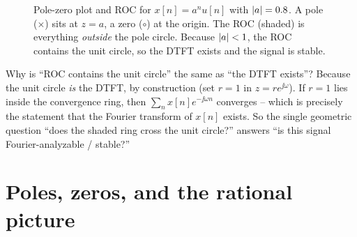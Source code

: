 \begin{figure}[H]
\centering
{}
\caption{Pole-zero plot and ROC for $x[n]=a^n u[n]$ with $\lvert a\rvert=0.8$. A pole
($\times$) sits at $z=a$, a zero ($\circ$) at the origin. The ROC (shaded) is everything
\emph{outside} the pole circle. Because $\lvert a\rvert<1$, the ROC contains the unit circle, so
the DTFT exists and the signal is stable.}
\label{ch15:fig-roc}
\end{figure}

\begin{whybox}
Why is ``ROC contains the unit circle'' the same as ``the DTFT exists''? Because the unit
circle \emph{is} the DTFT, by construction (set $r=1$ in $z=re^{\jj\omega}$). If $r=1$
lies inside the convergence ring, then $\sum_n x[n]e^{-\jj\omega n}$ converges -- which is
precisely the statement that the Fourier transform of $x[n]$ exists. So the single
geometric question ``does the shaded ring cross the unit circle?'' answers ``is this
signal Fourier-analyzable / stable?''
\end{whybox}

\section{Poles, zeros, and the rational picture}
\label{ch15:poles-zeros}

